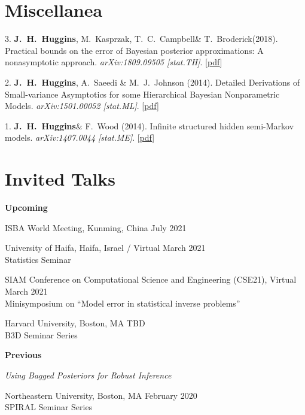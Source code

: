 \documentclass[margin,line]{res}
\newenvironment{talkgroup}{\setlength{\parskip}{3pt}\everypar{\hangafter=1\hangindent=1em\relax}\par}{\par\everypar{\hangafter=0\relax}}
\newcommand{\me}{\textbf{J.~H.~Huggins}\xspace}
\newcommand{\trevor}{T.~C.~Campbell\xspace}
\newcommand{\tamara}{T.~Broderick\xspace}
\newcommand{\paperref}[1]{[\href{#1}{pdf}]}
\newcommand{\paperref}[1]{}
\begin{document}
\begin{resume}

\section{\sc Miscellanea}

3. \me, M.~Kasprzak, \trevor \& \tamara (2018).
Practical bounds on the error of Bayesian posterior approximations: A nonasymptotic approach.
\emph{arXiv:1809.09505 [stat.TH]}.
\paperref{https://arxiv.org/abs/1809.09505}

2. \me, A.~Saeedi \& M.~J.~Johnson (2014).
Detailed Derivations of Small-variance Asymptotics for some Hierarchical Bayesian Nonparametric Models.
\emph{arXiv:1501.00052 [stat.ML]}.
\paperref{http://arxiv.org/abs/1501.00052}

1. \me \& F.~Wood (2014).
Infinite structured hidden semi-Markov models.
\emph{arXiv:1407.0044 [stat.ME]}.
\paperref{http://arxiv.org/abs/1407.0044}



\section{\sc Invited Talks}

\textbf{Upcoming} \\[-.5em]

\begin{talkgroup}

ISBA World Meeting, Kunming, China \hfill July 2021

University of Haifa, Haifa, Israel / Virtual \hfill March 2021 \\
Statistics Seminar

SIAM Conference on Computational Science and Engineering (CSE21), Virtual \hfill March 2021 \\
Minisymposium on ``Model error in statistical inverse problems''

Harvard University, Boston, MA \hfill TBD \\
B3D Seminar Series

\end{talkgroup}

\textbf{Previous}

\emph{Using Bagged Posteriors for Robust Inference}

\begin{talkgroup}
Northeastern University, Boston, MA \hfill February 2020 \\
SPIRAL Seminar Series


\end{talkgroup}
\end{resume}
\end{document}
